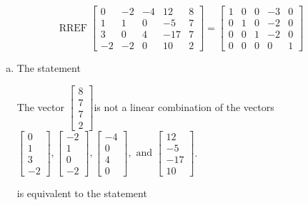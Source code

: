 \begin{exerciseAnswer} 
\[\operatorname{RREF}  \left[\begin{array}{cccc|c}
0 & -2 & -4 & 12 & 8 \\
1 & 1 & 0 & -5 & 7 \\
3 & 0 & 4 & -17 & 7 \\
-2 & -2 & 0 & 10 & 2
\end{array}\right] = \left[\begin{array}{cccc|c}
1 & 0 & 0 & -3 & 0 \\
0 & 1 & 0 & -2 & 0 \\
0 & 0 & 1 & -2 & 0 \\
0 & 0 & 0 & 0 & 1
\end{array}\right] \]
\begin{enumerate}[(a)]
\item  The statement 
\begin{center}\begin{minipage}{0.8\textwidth}
 The vector \( \left[\begin{array}{c}
8 \\
7 \\
7 \\
2
\end{array}\right] \)is not a linear combination of the vectors \( \left[\begin{array}{c}
0 \\
1 \\
3 \\
-2
\end{array}\right] , \left[\begin{array}{c}
-2 \\
1 \\
0 \\
-2
\end{array}\right] , \left[\begin{array}{c}
-4 \\
0 \\
4 \\
0
\end{array}\right] , \text{ and } \left[\begin{array}{c}
12 \\
-5 \\
-17 \\
10
\end{array}\right] \). 
\end{minipage}\end{center}
     is equivalent to the statement 
\begin{center}\begin{minipage}{0.8\textwidth}

\end{minipage}
\end{center}
\end{enumerate}
\end{exerciseAnswer}
